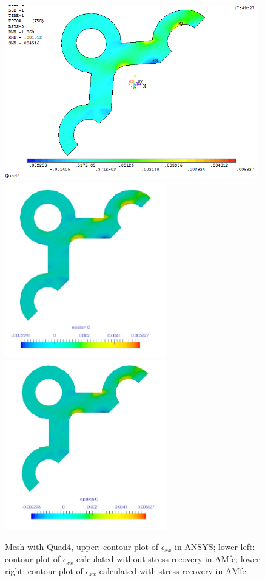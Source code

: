 \begin{figure}[htbp]
	\begin{center}
		\includegraphics[width=11cm,clip]{Quad4_Exx.png} 
		\includegraphics[width=7cm,clip]{Quad4_Exx_PD.png} 				
		\includegraphics[width=7cm,clip]{Quad4_Exx_P.png} 		
		\caption{Mesh with Quad4, upper: contour plot of $\epsilon_{xx}$ in ANSYS; lower left: contour plot of $\epsilon_{xx}$ calculated without stress recovery in AMfe; lower right: contour plot of $\epsilon_{xx}$ calculated with stress recovery in AMfe} \label{fig: Quad4_Exx}
	\end{center}
\end{figure}
\clearpage 

